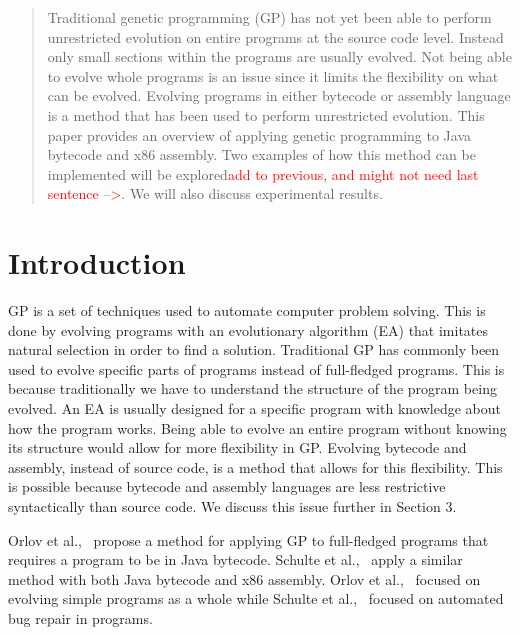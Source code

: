 \documentclass{sig-alternate}
\newcommand{\mycomment}[1]{\textcolor{red}{#1}}
\begin{document}
\maketitle
\begin{abstract}
Traditional genetic programming (GP) has not yet been able to perform unrestricted evolution on entire programs at the source code level. Instead only small sections within the programs are usually evolved. Not being able to evolve whole programs is an issue since it limits the flexibility on what can be evolved. Evolving programs in either bytecode or assembly language is a method that has been used to perform unrestricted evolution. This paper provides an overview of applying genetic programming to Java bytecode and x86 assembly. Two examples of how this method can be implemented will be explored\mycomment{add to previous, and might not need last sentence -->}. We will also discuss experimental results.
\end{abstract}



\section{Introduction}
GP is a set of techniques used to automate computer problem solving. This is done by evolving programs with an evolutionary algorithm (EA) that imitates natural selection in order to find a solution. Traditional GP has commonly been used to evolve specific parts of programs instead of full-fledged programs. This is because traditionally we have to understand the structure of the program being evolved. An EA is usually designed for a specific program with knowledge about how the program works. Being able to evolve an entire program without knowing its structure would allow for more flexibility in GP. Evolving bytecode and assembly, instead of source code, is a method that allows for this flexibility. This is possible because bytecode and assembly languages are less restrictive syntactically than source code. We discuss this issue further in Section 3.\par 

Orlov et al.,~\cite{FINCH2:2009} propose a method for applying GP to full-fledged programs that requires a program to be in Java bytecode. Schulte et al.,~\cite{Assembly:2010} apply a similar method with both Java bytecode and x86 assembly. Orlov et al.,~\cite{FINCH:2011} focused on evolving simple programs as a whole while Schulte et al.,~\cite{Assembly:2010} focused on automated bug repair in programs.\par
\end{document}
